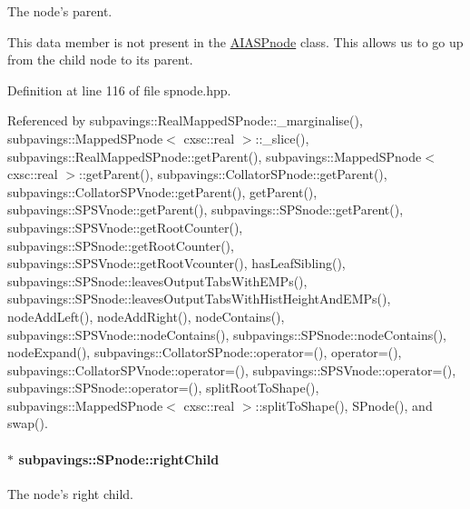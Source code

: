 \-The node's parent. 

\-This data member is not present in the \hyperlink{classAIASPnode}{\-A\-I\-A\-S\-Pnode} class. \-This allows us to go up from the child node to its parent. 

\-Definition at line 116 of file spnode.\-hpp.



\-Referenced by subpavings\-::\-Real\-Mapped\-S\-Pnode\-::\-\_\-marginalise(), subpavings\-::\-Mapped\-S\-Pnode$<$ cxsc\-::real $>$\-::\-\_\-slice(), subpavings\-::\-Real\-Mapped\-S\-Pnode\-::get\-Parent(), subpavings\-::\-Mapped\-S\-Pnode$<$ cxsc\-::real $>$\-::get\-Parent(), subpavings\-::\-Collator\-S\-Pnode\-::get\-Parent(), subpavings\-::\-Collator\-S\-P\-Vnode\-::get\-Parent(), get\-Parent(), subpavings\-::\-S\-P\-S\-Vnode\-::get\-Parent(), subpavings\-::\-S\-P\-Snode\-::get\-Parent(), subpavings\-::\-S\-P\-S\-Vnode\-::get\-Root\-Counter(), subpavings\-::\-S\-P\-Snode\-::get\-Root\-Counter(), subpavings\-::\-S\-P\-S\-Vnode\-::get\-Root\-Vcounter(), has\-Leaf\-Sibling(), subpavings\-::\-S\-P\-Snode\-::leaves\-Output\-Tabs\-With\-E\-M\-Ps(), subpavings\-::\-S\-P\-Snode\-::leaves\-Output\-Tabs\-With\-Hist\-Height\-And\-E\-M\-Ps(), node\-Add\-Left(), node\-Add\-Right(), node\-Contains(), subpavings\-::\-S\-P\-S\-Vnode\-::node\-Contains(), subpavings\-::\-S\-P\-Snode\-::node\-Contains(), node\-Expand(), subpavings\-::\-Collator\-S\-Pnode\-::operator=(), operator=(), subpavings\-::\-Collator\-S\-P\-Vnode\-::operator=(), subpavings\-::\-S\-P\-S\-Vnode\-::operator=(), subpavings\-::\-S\-P\-Snode\-::operator=(), split\-Root\-To\-Shape(), subpavings\-::\-Mapped\-S\-Pnode$<$ cxsc\-::real $>$\-::split\-To\-Shape(), \-S\-Pnode(), and swap().

\hypertarget{classsubpavings_1_1SPnode_a4d5e29412292750e36196b55e186b6dd}{
\paragraph[{right\-Child}]{$\ast$ {\bf subpavings\-::\-S\-Pnode\-::right\-Child}}}\label{classsubpavings_1_1SPnode_a4d5e29412292750e36196b55e186b6dd}


\-The node's right child. 



